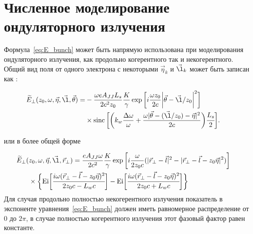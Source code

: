 \section{Численное моделирование ондуляторного излучения}
Формула~\ref{eq:E_bunch} может быть напрямую использована при моделирования ондуляторного излучения, как продольно когерентного так и некогерентного. Общий вид поля от одного электрона с некоторыми $\vec{\eta}_k$ и $\vec{\l}_k$ может быть записан как \cite{geloni_fourier_2007} : 

\begin{align}
	\widetilde{E}_{\bot}(z_0, \omega, \vec{\eta}, \vec{\l}, \vec{\theta} ) =
&	-\frac{\omega e A_{JJ} L_s}{2c^2z_0}\frac{K}{\gamma}\exp{\bigg[i \frac{\omega z_0}{2c} \bigg|\vec{\theta} - \vec{\l}/z_0\bigg|^2 \bigg]} \cr & \times \sinc \bigg[\bigg(k_w \frac{\Delta \omega}{\omega} + \frac{\omega |\vec{\theta} - (\vec{\l}/z_0) - \vec{\eta}|^2}{2c}\bigg)\cfrac{L_s}{2}\bigg].
	\label{eq:single_electron_far_field}
\end{align}

или в более общей форме

\begin{align}
	\widetilde{E}_{\bot}(&z_0, \omega, \vec{\eta}, \vec{\l}, \vec{r}_{\bot}) =
		\frac{e A_{JJ} \omega}{2 c^2}\frac{K}{\gamma} \exp{\bigg[i \frac{\omega}{2 z_0 c} (|\vec{r}_{\bot} - \vec{l}|^2 - |\vec{r}_{\bot} - \vec{l} - z_0 \vec{\eta}|^2) \bigg]} \cr & \times	\bigg \{ \text{Ei} \bigg[ \cfrac{i \omega (\vec{r}_{\bot} - \vec{l} - z_0 \vec{\eta})^2}{2z_0c - L_w c}\bigg] - \text{Ei} \bigg[ \cfrac{i \omega (\vec{r}_{\bot} - \vec{l} - z_0 \vec{\eta})^2}{2z_0c + L_w c} \bigg] \bigg\}
	\label{eq:single_electron_near_field}
\end{align}
Для случая продольно полностью некогерентного излучения показатель в экспоненте уравнения~\ref{eq:E_bunch} должен иметь равномерное распределение от $0$ до $2 \pi$, в случае полностью когерентного излучения этот фазовый фактор равен константе. 
 
